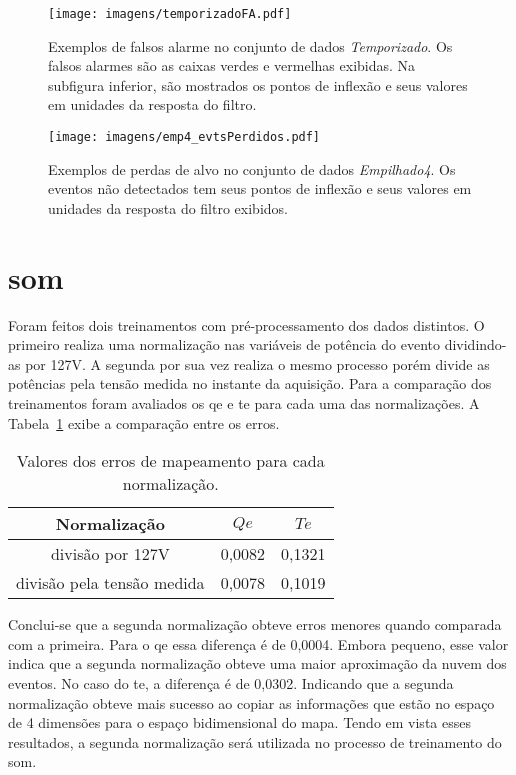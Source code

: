 \begin{sidewaysfigure}[p]
\centering
\texttt{[image: imagens/temporizadoFA.pdf]}
\caption[Exemplos de falsos alarme no conjunto de dados \emph{Temporizado}.]
{Exemplos de falsos alarme no conjunto de dados \emph{Temporizado}. Os
falsos alarmes são as caixas verdes e vermelhas exibidas. Na subfigura
inferior, são mostrados os pontos de inflexão e seus valores em
unidades da resposta do filtro.}
\label{fig:ruido_temporizado}
\end{sidewaysfigure}

\begin{sidewaysfigure}[p]
\centering
\texttt{[image: imagens/emp4\_evtsPerdidos.pdf]}
\caption[Exemplos de perdas de alvo no conjunto de dados Empilhado4]
{Exemplos de perdas de alvo no conjunto de dados \emph{Empilhado4}. Os
eventos não detectados tem seus pontos de inflexão e seus valores em
unidades da resposta do filtro exibidos.}
\label{fig:lampadas_emp4}
\end{sidewaysfigure}

\section{\acl{som}}
\label{sec:som_resultadados}

Foram feitos dois treinamentos com pré-processamento dos dados
distintos. O primeiro realiza uma normalização nas variáveis de
potência do evento dividindo-as por 127V. A segunda por sua vez
realiza o mesmo processo porém divide as potências pela tensão medida
no instante da aquisição. Para a comparação dos treinamentos foram
avaliados os \gls{qe} e \gls{te} para cada uma das normalizações. A
Tabela~\ref{tab:te_qe_norm} exibe a comparação entre os erros.
	
\begin{table}[!htb]
\centering
\begin{tabular}{ccc}
\hline \hline
Normalização & $Qe$ & $Te$\\
\hline \hline
divisão por 127V & 0,0082 & 0,1321 \\
\hline
divisão pela tensão medida & 0,0078 & 0,1019 \\
\hline
\hline
\end{tabular}
\caption{Valores dos erros de mapeamento para cada normalização.}
\label{tab:te_qe_norm}
\end{table}	
	
Conclui-se que a segunda normalização obteve erros menores quando
comparada com a primeira. Para o \gls{qe} essa
diferença é de 0,0004. Embora pequeno, esse valor indica que a segunda
normalização obteve uma maior aproximação da nuvem dos eventos. No
caso do \gls{te}, a diferença é de 0,0302. Indicando que a segunda
normalização obteve mais sucesso ao copiar as informações que estão no
espaço de 4 dimensões para o espaço bidimensional do mapa. Tendo em
vista esses resultados, a segunda normalização será utilizada no
processo de treinamento do \acs{som}.

